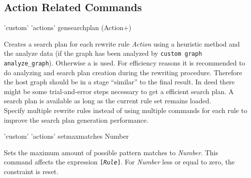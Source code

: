 \subsection{Action Related Commands}
\begin{rail}
  'custom' 'actions' gensearchplan (Action+)
\end{rail}
Creates a search plan for each rewrite rule \emph{Action} using a heuristic method and the analyze data (if the graph has been analyzed by \texttt{custom graph analyze\_graph}). Otherwise a  is used. For efficiency reasons it is recommended to do analyzing and search plan creation during the rewriting procedure. Therefore the host graph should be in a stage ``similar'' to the final result. In deed there might be some trial-and-error steps necessary to get a efficient search plan. A search plan is available as long as the current rule set remains loaded. \\
Specify multiple rewrite rules instead of using multiple commands for each rule to improve the search plan generation performance.

\begin{rail}
  'custom' 'actions' setmaxmatches Number
\end{rail}
Sets the maximum amount of possible pattern matches to \emph{Number}. This command affects the expression \texttt{[\emph{Rule}]}. For \emph{Number} less or equal to zero, the constraint is reset.

